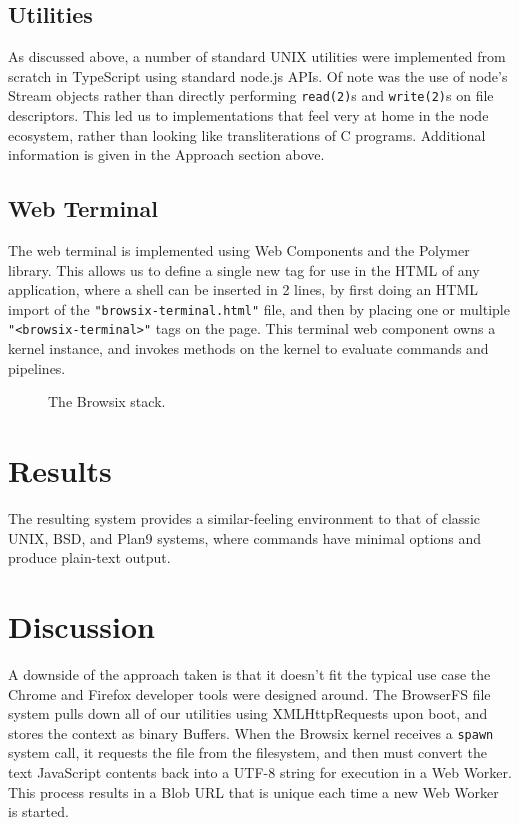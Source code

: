 \documentclass{acm_proc_article-sp}
\begin{document}
\subsection{Utilities}

As discussed above, a number of standard UNIX utilities were
implemented from scratch in TypeScript using standard node.js APIs.
Of note was the use of node's Stream objects rather than directly
performing \texttt{read(2)}s and \texttt{write(2)}s on file
descriptors.  This led us to implementations that feel very at home in
the node ecosystem, rather than looking like transliterations of C
programs.  Additional information is given in the Approach section
above.

\subsection{Web Terminal}

The web terminal is implemented using Web Components and the Polymer
library.  This allows us to define a single new tag for use in the
HTML of any application, where a shell can be inserted in 2 lines, by
first doing an HTML import of the \texttt{"browsix-terminal.html"}
file, and then by placing one or multiple
\texttt{"<browsix-terminal>"} tags on the page.  This terminal web
component owns a kernel instance, and invokes methods on the kernel to
evaluate commands and pipelines.

\begin{figure}
\centering
{}
\caption{The Browsix stack.}
\end{figure}

\section{Results}

The resulting system provides a similar-feeling environment to that of
classic UNIX, BSD, and Plan9 systems, where commands have minimal
options and produce plain-text output.

\section{Discussion}

A downside of the approach taken is that it doesn't fit the typical
use case the Chrome and Firefox developer tools were designed around.
The BrowserFS file system pulls down all of our utilities using
XMLHttpRequests upon boot, and stores the context as binary Buffers.
When the Browsix kernel receives a \texttt{spawn} system call, it
requests the file from the filesystem, and then must convert the text
JavaScript contents back into a UTF-8 string for execution in a Web
Worker.  This process results in a Blob URL that is unique each time a
new Web Worker is started.
\end{document}
